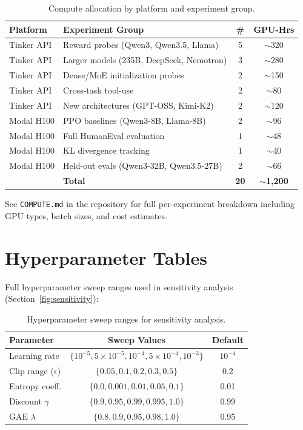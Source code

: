 \documentclass{article}
\begin{document}
\begin{table}[htbp]
\centering
\caption{Compute allocation by platform and experiment group.}
\small
\begin{tabular}{@{}llcc@{}}
\toprule
\textbf{Platform} & \textbf{Experiment Group} & \textbf{\#} & \textbf{GPU-Hrs} \\
\midrule
Tinker API & Reward probes (Qwen3, Qwen3.5, Llama) & 5 & $\sim$320 \\
Tinker API & Larger models (235B, DeepSeek, Nemotron) & 3 & $\sim$280 \\
Tinker API & Dense/MoE initialization probes & 2 & $\sim$150 \\
Tinker API & Cross-task tool-use & 2 & $\sim$80 \\
Tinker API & New architectures (GPT-OSS, Kimi-K2) & 2 & $\sim$120 \\
Modal H100 & PPO baselines (Qwen3-8B, Llama-8B) & 2 & $\sim$96 \\
Modal H100 & Full HumanEval evaluation & 1 & $\sim$48 \\
Modal H100 & KL divergence tracking & 1 & $\sim$40 \\
Modal H100 & Held-out evals (Qwen3-32B, Qwen3.5-27B) & 2 & $\sim$66 \\
\midrule
 & \textbf{Total} & \textbf{20} & $\sim$\textbf{1,200} \\
\bottomrule
\end{tabular}
\end{table}

See \texttt{COMPUTE.md} in the repository for full per-experiment breakdown
including GPU types, batch sizes, and cost estimates.

\section{Hyperparameter Tables}
\label{app:hyperparams}

Full hyperparameter sweep ranges used in sensitivity analysis (Section~\ref{fig:sensitivity}):

\begin{table}[htbp]
\centering
\caption{Hyperparameter sweep ranges for sensitivity analysis.}
\begin{tabular}{lcc}
\toprule
\textbf{Parameter} & \textbf{Sweep Values} & \textbf{Default} \\
\midrule
Learning rate & $\{10^{-5}, 5 \times 10^{-5}, 10^{-4}, 5 \times 10^{-4}, 10^{-3}\}$ & $10^{-4}$ \\
Clip range ($\epsilon$) & $\{0.05, 0.1, 0.2, 0.3, 0.5\}$ & 0.2 \\
Entropy coeff. & $\{0.0, 0.001, 0.01, 0.05, 0.1\}$ & 0.01 \\
Discount $\gamma$ & $\{0.9, 0.95, 0.99, 0.995, 1.0\}$ & 0.99 \\
GAE $\lambda$ & $\{0.8, 0.9, 0.95, 0.98, 1.0\}$ & 0.95 \\
\bottomrule
\end{tabular}
\end{table}
\end{document}
